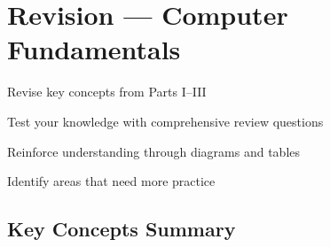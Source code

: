 \chapter{Revision --- Computer Fundamentals}
\label{ch:revision-fundamentals}

\begin{objectives}
  \item Revise key concepts from Parts I--III
  \item Test your knowledge with comprehensive review questions
  \item Reinforce understanding through diagrams and tables
  \item Identify areas that need more practice
\end{objectives}


\section{Key Concepts Summary}
\label{sec:revision-summary}

